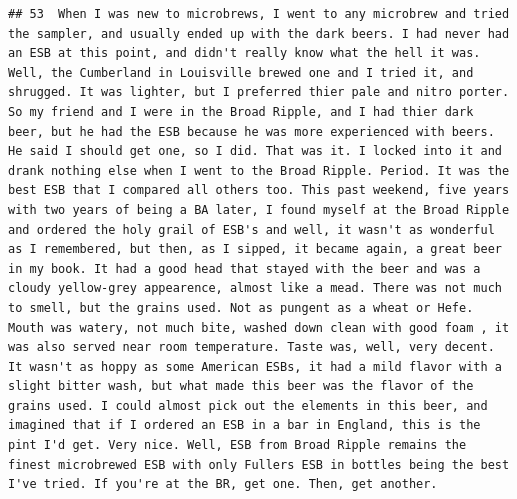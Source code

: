 \documentclass[
  a4paper,
]{article}
\begin{document}
\begin{verbatim}
## 53  When I was new to microbrews, I went to any microbrew and tried the sampler, and usually ended up with the dark beers. I had never had an ESB at this point, and didn't really know what the hell it was. Well, the Cumberland in Louisville brewed one and I tried it, and shrugged. It was lighter, but I preferred thier pale and nitro porter. So my friend and I were in the Broad Ripple, and I had thier dark beer, but he had the ESB because he was more experienced with beers. He said I should get one, so I did. That was it. I locked into it and drank nothing else when I went to the Broad Ripple. Period. It was the best ESB that I compared all others too. This past weekend, five years with two years of being a BA later, I found myself at the Broad Ripple and ordered the holy grail of ESB's and well, it wasn't as wonderful as I remembered, but then, as I sipped, it became again, a great beer in my book. It had a good head that stayed with the beer and was a cloudy yellow-grey appearence, almost like a mead. There was not much to smell, but the grains used. Not as pungent as a wheat or Hefe. Mouth was watery, not much bite, washed down clean with good foam , it was also served near room temperature. Taste was, well, very decent. It wasn't as hoppy as some American ESBs, it had a mild flavor with a slight bitter wash, but what made this beer was the flavor of the grains used. I could almost pick out the elements in this beer, and imagined that if I ordered an ESB in a bar in England, this is the pint I'd get. Very nice. Well, ESB from Broad Ripple remains the finest microbrewed ESB with only Fullers ESB in bottles being the best I've tried. If you're at the BR, get one. Then, get another.

\end{verbatim}
\end{document}
